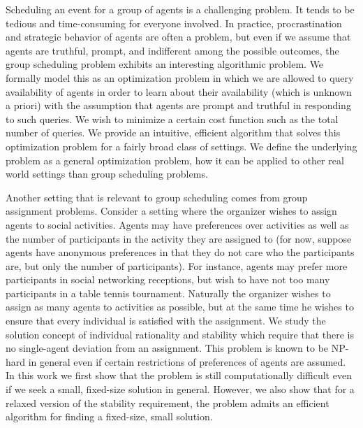 \label{intro:chapter}
Scheduling an event for a group of agents is a challenging problem. 
It tends to be tedious and time-consuming for everyone involved.
In practice, procrastination and strategic behavior of agents are often a problem, but even if we assume that agents are truthful, prompt, and indifferent among the possible outcomes, the group scheduling problem exhibits an interesting algorithmic problem. 
We formally model this as an optimization problem in which we are allowed to query availability of agents in order to learn about their availability (which is unknown a priori) with the assumption that agents are prompt and truthful in responding to such queries. We wish to minimize a certain cost function such as the total number of queries. We provide an intuitive, efficient algorithm that solves this optimization problem for a fairly broad class of settings. We define the underlying problem as a general optimization problem, how it can be applied to other real world settings than group scheduling problems.

Another setting that is relevant to group scheduling comes from group assignment problems. Consider a setting where the organizer wishes to assign agents to social activities. Agents may have preferences over activities as well as the number of participants in the activity they are assigned to (for now, suppose agents have anonymous preferences in that they do not care who the participants are, but only the number of participants). For instance, agents may prefer more participants in social networking receptions, but wish to have not too many participants in a table tennis tournament. Naturally the organizer wishes to assign as many agents to activities as possible, but at the same time he wishes to ensure that every individual is satisfied with the assignment. We study the solution concept of individual rationality and stability which require that there is no single-agent deviation from an assignment. This problem is known to be NP-hard in general even if certain restrictions of preferences of agents are assumed. In this work we first show that the problem is still computationally difficult even if we seek a small, fixed-size solution in general. However, we also show that for a relaxed version of the stability requirement, the problem admits an efficient algorithm for finding a fixed-size, small solution. 

